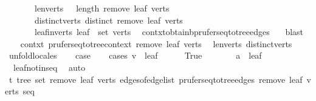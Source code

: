 \begin{isabellebody}
\ \ \ \ \ \ \ len{\isacharunderscore}{\kern0pt}verts{\isacharprime}{\kern0pt}{\isacharcolon}{\kern0pt}\ {\isachardoublequoteopen}{}\ {\isasymle}\ length\ {\isacharparenleft}{\kern0pt}remove{}\ leaf\ verts{\isacharparenright}{\kern0pt}{\isachardoublequoteclose}\isanewline
\ \ \ \ \ \ \ distinct{\isacharunderscore}{\kern0pt}verts{\isacharprime}{\kern0pt}{\isacharcolon}{\kern0pt}\ {\isachardoublequoteopen}distinct\ {\isacharparenleft}{\kern0pt}remove{}\ leaf\ verts{\isacharparenright}{\kern0pt}{\isachardoublequoteclose}\isanewline
\ \ \ \ \ \ \ leaf{\isacharunderscore}{\kern0pt}in{\isacharunderscore}{\kern0pt}verts{\isacharcolon}{\kern0pt}\ {\isachardoublequoteopen}leaf\ {\isasymin}\ set\ verts{\isachardoublequoteclose}\ \isamarkupfalse%
\ contxt{\isachardot}{\kern0pt}obtain{\isacharunderscore}{\kern0pt}b{\isacharunderscore}{\kern0pt}prufer{\isacharunderscore}{\kern0pt}seq{\isacharunderscore}{\kern0pt}to{\isacharunderscore}{\kern0pt}tree{\isacharunderscore}{\kern0pt}edges\ {}\ \isamarkupfalse%
\ blast\isanewline
\ \ \isamarkupfalse%
\ contxt{\isacharprime}{\kern0pt}{\isacharcolon}{\kern0pt}\ prufer{\isacharunderscore}{\kern0pt}seq{\isacharunderscore}{\kern0pt}to{\isacharunderscore}{\kern0pt}tree{\isacharunderscore}{\kern0pt}context\ {\isachardoublequoteopen}remove{}\ leaf\ verts{\isachardoublequoteclose}\ \isamarkupfalse%
\ len{\isacharunderscore}{\kern0pt}verts{\isacharprime}{\kern0pt}\ distinct{\isacharunderscore}{\kern0pt}verts{\isacharprime}{\kern0pt}\ \isamarkupfalse%
\ unfold{\isacharunderscore}{\kern0pt}locales\isanewline
\ \ \isamarkupfalse%
\ {\isacharquery}{\kern0pt}case\isanewline
\ \ \isamarkupfalse%
\ {\isacharparenleft}{\kern0pt}cases\ {\isachardoublequoteopen}v\ {\isacharequal}{\kern0pt}\ leaf{\isachardoublequoteclose}{\isacharparenright}{\kern0pt}\isanewline
\ \ \ \ \isamarkupfalse%
\ True\isanewline
\ \ \ \ \isamarkupfalse%
\ \isamarkupfalse%
\ {\isachardoublequoteopen}a\ {\isasymnoteq}\ leaf{\isachardoublequoteclose}\ \isamarkupfalse%
\ {}\ leaf{\isacharunderscore}{\kern0pt}not{\isacharunderscore}{\kern0pt}in{\isacharunderscore}{\kern0pt}seq\ \isamarkupfalse%
\ auto\isanewline
\ \ \ \ \isamarkupfalse%
\ t{\isacharcolon}{\kern0pt}\ tree\ {\isachardoublequoteopen}set\ {\isacharparenleft}{\kern0pt}remove{}\ leaf\ verts{\isacharparenright}{\kern0pt}{\isachardoublequoteclose}\ {\isachardoublequoteopen}edges{\isacharunderscore}{\kern0pt}of{\isacharunderscore}{\kern0pt}edge{\isacharunderscore}{\kern0pt}list\ {\isacharparenleft}{\kern0pt}prufer{\isacharunderscore}{\kern0pt}seq{\isacharunderscore}{\kern0pt}to{\isacharunderscore}{\kern0pt}tree{\isacharunderscore}{\kern0pt}edges\ {\isacharparenleft}{\kern0pt}remove{}\ leaf\ verts{\isacharparenright}{\kern0pt}\ seq{\isacharparenright}{\kern0pt}{\isachardoublequoteclose}\isanewline

\end{isabellebody}
